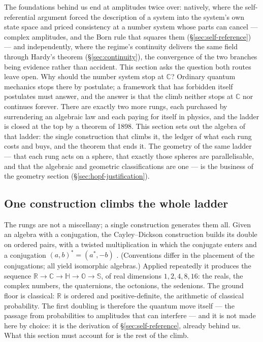 The foundations behind us end at amplitudes twice over: natively, where the self-referential
argument forced the description of a system into the system's own state space and priced
consistency at a number system whose parts can cancel --- complex amplitudes, and the Born rule
that squares them (\S\ref{sec:self-reference}) --- and independently, where the regime's
continuity delivers the same field through Hardy's theorem (\S\ref{sec:continuity}), the
convergence of the two branches being evidence rather than accident. This section asks the question
both routes leave open. Why
should the number system stop at $\mathbb{C}$? Ordinary quantum mechanics stops there by postulate;
a framework that has forbidden itself postulates must answer, and the answer is that the climb
neither stops at $\mathbb{C}$ nor continues forever. There are exactly two more rungs, each
purchased by surrendering an algebraic law and each paying for itself in physics, and the ladder is
closed at the top by a theorem of 1898. This section sets out the algebra of that ladder: the single
construction that climbs it, the ledger of what each rung costs and buys, and the theorem that ends
it. The geometry of the same ladder --- that each rung acts on a sphere, that exactly those spheres
are parallelisable, and that the algebraic and geometric classifications are one --- is the business
of the geometry section (\S\ref{sec:hopf-justification}).

\subsection{One construction climbs the whole ladder}

The rungs are not a miscellany; a single construction generates them all. Given an algebra with a
conjugation, the Cayley--Dickson construction builds its double on ordered pairs, with a twisted
multiplication in which the conjugate enters and a conjugation $(a,b)^{*} = (a^{*}, -b)$
\autocite{baez2002octonions}. (Conventions differ in the placement of the conjugations; all yield
isomorphic algebras.) Applied repeatedly it produces the sequence
$\mathbb{R} \to \mathbb{C} \to \mathbb{H} \to \mathbb{O} \to \mathbb{S}$, of real dimensions
$1, 2, 4, 8, 16$: the reals, the complex numbers, the quaternions, the octonions, the sedenions.
The ground floor is classical: $\mathbb{R}$ is ordered and positive-definite, the arithmetic of
classical probability. The first doubling is therefore the quantum move itself --- the passage from
probabilities to amplitudes that can interfere --- and it is not made here by choice: it is the
derivation of \S\ref{sec:self-reference}, already behind us. What this section must account for is
the rest of the climb.

